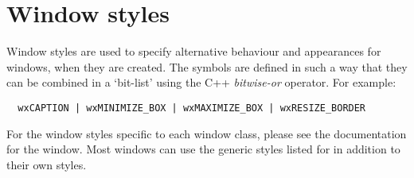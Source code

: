 
\section{Window styles}\label{windowstyles}

Window styles are used to specify alternative behaviour and appearances for windows, when they are
created. The symbols are defined in such a way that they can be combined in a `bit-list' using the
C++ {\it bitwise-or} operator. For example:

\begin{verbatim}
  wxCAPTION | wxMINIMIZE_BOX | wxMAXIMIZE_BOX | wxRESIZE_BORDER
\end{verbatim}

For the window styles specific to each window class, please see the documentation
for the window. Most windows can use the generic styles listed for  in
addition to their own styles.
